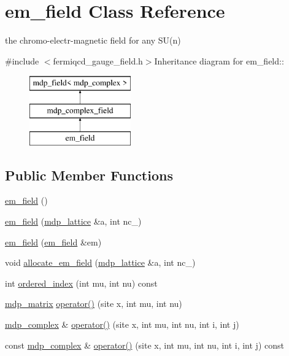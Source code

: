 \hypertarget{classem__field}{
\section{em\_\-field Class Reference}
\label{classem__field}
}


the chromo-\/electr-\/magnetic field for any SU(n)  


{\ttfamily \#include $<$fermiqcd\_\-gauge\_\-field.h$>$}Inheritance diagram for em\_\-field::\begin{figure}[H]
\begin{center}
\leavevmode
\includegraphics[height=3cm]{classem__field}
\end{center}
\end{figure}
\subsection*{Public Member Functions}
\begin{DoxyCompactItemize}
\item 
\hyperlink{classem__field_a919bf7292d3c2748663f48d325ea2fa3}{em\_\-field} ()
\item 
\hyperlink{classem__field_a15c0bc41753d8728c251f51b48e0f1ea}{em\_\-field} (\hyperlink{classmdp__lattice}{mdp\_\-lattice} \&a, int nc\_\-)
\item 
\hyperlink{classem__field_ab061ffebdbd768362b56121237c1ac80}{em\_\-field} (\hyperlink{classem__field}{em\_\-field} \&em)
\item 
void \hyperlink{classem__field_ae4f6727d2b31a8d7eec93bf3506c92fb}{allocate\_\-em\_\-field} (\hyperlink{classmdp__lattice}{mdp\_\-lattice} \&a, int nc\_\-)
\item 
int \hyperlink{classem__field_a3f93a7ad7324b58e5554ac996fa12282}{ordered\_\-index} (int mu, int nu) const 
\item 
\hyperlink{classmdp__matrix}{mdp\_\-matrix} \hyperlink{classem__field_a4afce0ed26593545c4a61892880823bc}{operator()} (site x, int mu, int nu)
\item 
\hyperlink{classmdp__complex}{mdp\_\-complex} \& \hyperlink{classem__field_ab5063637e3b890ae95ea46b8458c6fc7}{operator()} (site x, int mu, int nu, int i, int j)
\item 
const \hyperlink{classmdp__complex}{mdp\_\-complex} \& \hyperlink{classem__field_a68b499892a9404f8b469677e28506180}{operator()} (site x, int mu, int nu, int i, int j) const 
\end{DoxyCompactItemize}
